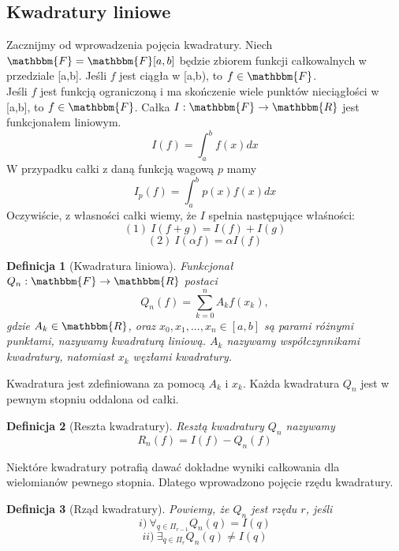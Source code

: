 \documentclass{article}
\newtheorem{defi}{Definicja}
\begin{document}
\subsection{Kwadratury liniowe}
Zacznijmy od wprowadzenia pojęcia kwadratury. Niech $\mathbbm{F} = \mathbbm{F}[a,b]$ będzie zbiorem funkcji całkowalnych w przedziale [a,b].
Jeśli $f$ jest ciągła w [a,b), to $f \in \mathbbm{F}$. \\
Jeśli $f$ jest funkcją ograniczoną i ma skończenie wiele punktów nieciągłości w [a,b], to $f \in \mathbbm{F}$.
Całka $I: \mathbbm{F} \to \mathbbm{R}$ jest funkcjonałem liniowym.
\begin{equation*}
	I(f) = \int_a^b f(x) dx
\end{equation*}
W przypadku całki z daną funkcją wagową $p$ mamy
\begin{equation*}
	I_p(f) = \int_a^b p(x) f(x) dx
\end{equation*}
Oczywiście, z własności całki wiemy, że $I$ spełnia następujące właśności:
\begin{equation*}
	(1) \ I(f + g) = I(f) + I(g)
\end{equation*}
\begin{equation*}
	(2) \ I(\alpha f) = \alpha I(f)
\end{equation*}
\begin{defi}[Kwadratura liniowa]
	Funkcjonał $Q_n: \mathbbm{F} \to \mathbbm{R}$ postaci
	\begin{equation}
		Q_n(f) = \sum_{k = 0}^n A_k f(x_k),
	\end{equation}
	gdzie $A_k \in \mathbbm{R}$, oraz $x_0, x_1, ..., x_n \in [a,b]$ są parami różnymi punktami,
	nazywamy kwadraturą liniową. $A_k$ nazywamy współczynnikami kwadratury, natomiast $x_k$ węzłami kwadratury.
\end{defi}
Kwadratura jest zdefiniowana za pomocą $A_k$ i $x_k$. Każda kwadratura $Q_n$ jest w pewnym stopniu oddalona od całki.
\begin{defi}[Reszta kwadratury]
	Resztą kwadratury $Q_n$ nazywamy
	\begin{equation}
		R_n(f) = I(f) - Q_n(f)
	\end{equation}
\end{defi}
Niektóre kwadratury potrafią dawać dokładne wyniki całkowania dla wielomianów pewnego stopnia.
Dlatego wprowadzono pojęcie rzędu kwadratury.
\begin{defi}[Rząd kwadratury]
	Powiemy, że $Q_n$ jest rzędu $r$, jeśli
	\begin{equation*}
		i) \ \forall_{q \in \Pi_{r-1}} Q_n(q) = I(q)
	\end{equation*}
	\begin{equation*}
		ii) \ \exists_{q \in \Pi_r} Q_n(q) \neq I(q)
	\end{equation*}
\end{defi}
\end{document}
